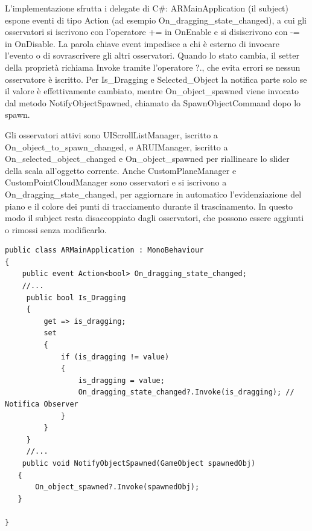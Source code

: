 L’implementazione sfrutta i delegate di C\#: ARMainApplication (il subject) espone eventi di tipo Action (ad esempio On\_dragging\_state\_changed), a cui gli osservatori si iscrivono con l’operatore += in OnEnable e si disiscrivono con -= in OnDisable. La parola chiave event impedisce a chi è esterno di invocare l’evento o di sovrascrivere gli altri osservatori. Quando lo stato cambia, il setter della proprietà richiama Invoke tramite l’operatore ?., che evita errori se nessun osservatore è iscritto. Per Is\_Dragging e Selected\_Object la notifica parte solo se il valore è effettivamente cambiato, mentre On\_object\_spawned viene invocato dal metodo NotifyObjectSpawned, chiamato da SpawnObjectCommand dopo lo spawn.

Gli osservatori attivi sono UIScrollListManager, iscritto a On\_object\_to\_spawn\_changed, e ARUIManager, iscritto a On\_selected\_object\_changed e On\_object\_spawned per riallineare lo slider della scala all’oggetto corrente. Anche CustomPlaneManager e CustomPointCloudManager sono osservatori e si iscrivono a On\_dragging\_state\_changed, per aggiornare in automatico l’evidenziazione del piano e il colore dei punti di tracciamento durante il trascinamento. In questo modo il subject resta disaccoppiato dagli osservatori, che possono essere aggiunti o rimossi senza modificarlo.

\begin{lstlisting}[language={[Sharp]C}]
public class ARMainApplication : MonoBehaviour
{
    public event Action<bool> On_dragging_state_changed;
    //...
     public bool Is_Dragging
     {
         get => is_dragging;
         set
         {
             if (is_dragging != value)
             {
                 is_dragging = value;
                 On_dragging_state_changed?.Invoke(is_dragging); // Notifica Observer
             }
         }
     }
     //...
    public void NotifyObjectSpawned(GameObject spawnedObj)
   {
       On_object_spawned?.Invoke(spawnedObj);
   }

}

\end{lstlisting}

